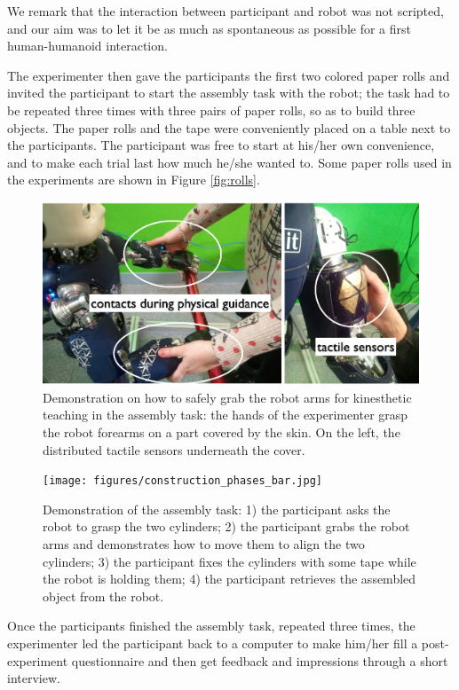 \documentclass[twocolumn]{svjour3}          %
\begin{document}
We remark that the interaction between participant and robot was not scripted, and our aim was to let it be as much as spontaneous as possible for a first human-humanoid interaction.

The experimenter then gave the participants the first two colored paper rolls and invited the participant to start the assembly task with the robot; the task had to be repeated three times with three pairs of paper rolls, so as to build three objects. The paper rolls and the tape were conveniently placed on a table next to the participants.
The participant was free to start at his/her own convenience, and to make each trial last how much he/she wanted to.
Some paper rolls used in the experiments are shown in Figure \ref{fig:rolls}.


\begin{figure}
\centering
\includegraphics[width=0.95\hsize]{figures/contacts_guidance.png}
\caption{Demonstration on how to safely grab the robot arms for kinesthetic teaching in the assembly task: the hands of the experimenter grasp the robot forearms on a part covered by the skin. On the left, the distributed tactile sensors underneath the cover.}
\label{fig:contacts}
\end{figure}


\begin{figure}
\centering
\texttt{[image: figures/construction\_phases\_bar.jpg]}
\caption{Demonstration of the assembly task: 1) the participant asks the robot to grasp the two cylinders; 2) the participant grabs the robot arms and demonstrates how to move them to align the two cylinders; 3) the participant fixes the cylinders with some tape while the robot is holding them; 4) the participant retrieves the assembled object from the robot. }
\label{fig:task}
\end{figure}

Once the participants finished the assembly task, repeated three times, the experimenter led the participant back to a computer to make him/her fill a post-experiment questionnaire and then get feedback and impressions through a short interview.
\end{document}
